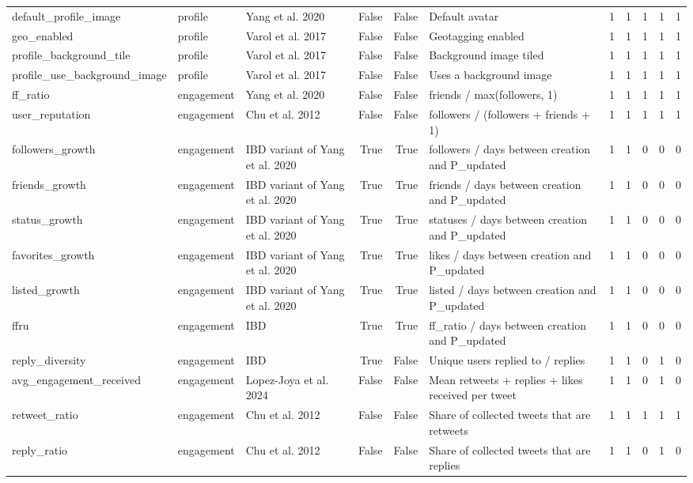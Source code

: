 \begin{tabular}{lllrrlrrrrr}
default_profile_image & profile & Yang et al. 2020 & False & False & Default avatar & 1 & 1 & 1 & 1 & 1 \\
geo_enabled & profile & Varol et al. 2017 & False & False & Geotagging enabled & 1 & 1 & 1 & 1 & 1 \\
profile_background_tile & profile & Varol et al. 2017 & False & False & Background image tiled & 1 & 1 & 1 & 1 & 1 \\
profile_use_background_image & profile & Varol et al. 2017 & False & False & Uses a background image & 1 & 1 & 1 & 1 & 1 \\
ff_ratio & engagement & Yang et al. 2020 & False & False & friends / max(followers, 1) & 1 & 1 & 1 & 1 & 1 \\
user_reputation & engagement & Chu et al. 2012 & False & False & followers / (followers + friends + 1) & 1 & 1 & 1 & 1 & 1 \\
followers_growth & engagement & IBD variant of Yang et al. 2020 & True & True & followers / days between creation and P_updated & 1 & 1 & 0 & 0 & 0 \\
friends_growth & engagement & IBD variant of Yang et al. 2020 & True & True & friends / days between creation and P_updated & 1 & 1 & 0 & 0 & 0 \\
status_growth & engagement & IBD variant of Yang et al. 2020 & True & True & statuses / days between creation and P_updated & 1 & 1 & 0 & 0 & 0 \\
favorites_growth & engagement & IBD variant of Yang et al. 2020 & True & True & likes / days between creation and P_updated & 1 & 1 & 0 & 0 & 0 \\
listed_growth & engagement & IBD variant of Yang et al. 2020 & True & True & listed / days between creation and P_updated & 1 & 1 & 0 & 0 & 0 \\
ffru & engagement & IBD & True & True & ff_ratio / days between creation and P_updated & 1 & 1 & 0 & 0 & 0 \\
reply_diversity & engagement & IBD & True & False & Unique users replied to / replies & 1 & 1 & 0 & 1 & 0 \\
avg_engagement_received & engagement & Lopez-Joya et al. 2024 & False & False & Mean retweets + replies + likes received per tweet & 1 & 1 & 0 & 1 & 0 \\
retweet_ratio & engagement & Chu et al. 2012 & False & False & Share of collected tweets that are retweets & 1 & 1 & 1 & 1 & 1 \\
reply_ratio & engagement & Chu et al. 2012 & False & False & Share of collected tweets that are replies & 1 & 1 & 0 & 1 & 0 \\

\end{tabular}
